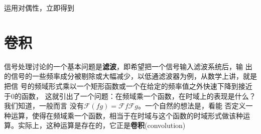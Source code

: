 \documentclass{ctexbook}
\begin{document}
运用对偶性，立即得到

\section{卷积}\label{sec:convolution}

信号处理讨论的一个基本问题是\textbf{滤波}，即希望把一个信号输入滤波系统后，输
出的信号的一些频率成分被剔除或大幅减少，以低通滤波器为例，从数学上讲，就是把信
号的频域形式乘以一个矩形函数或一个在给定的频率值之外快速下降到接近于0的函数，
这就引出了一个问题：在频域乘一个函数，在时域上的表现是什么？我们知道，一般而言
没有$\mathcal{F} (fg)=\mathcal{F} f\mathcal{F} g$。一个自然的想法是，看能
否定义一种运算，使得在频域乘一个函数，相当于在时域与这个函数的时域形式做该种运
算。实际上，这种运算是存在的，它正是\textbf{卷积}(convolution)
\end{document}
